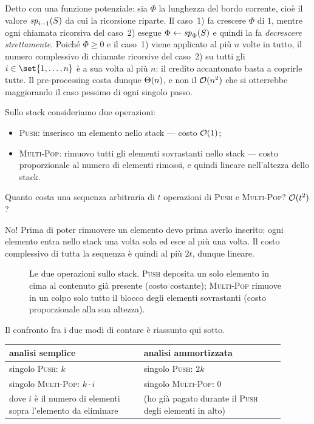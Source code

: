 \begin{osservazione}
  Detto con una funzione potenziale: sia $\Phi$ la lunghezza del bordo corrente,
  cioè il valore $\mathit{sp}_{i-1}(S)$ da cui la ricorsione riparte. Il caso~1) fa
  crescere $\Phi$ di $1$, mentre ogni chiamata ricorsiva del caso~2) esegue
  $\Phi \leftarrow \mathit{sp}_{\Phi}(S)$ e quindi la fa \emph{decrescere strettamente}.
  Poiché $\Phi\ge 0$ e il caso~1) viene applicato al più $n$ volte in tutto, il
  numero complessivo di chiamate ricorsive del caso~2) su tutti gli
  $i\in\set{1,\dots,n}$ è a sua volta al più $n$: il credito accantonato basta a
  coprirle tutte. Il pre-processing costa dunque $\Theta(n)$, e non il $\mathcal{O}(n^{2})$
  che si otterrebbe maggiorando il caso pessimo di ogni singolo passo.
\end{osservazione}

\begin{esempio}
  Sullo stack consideriamo due operazioni:
  \begin{itemize}
    \item \textsc{Push}: inserisco un elemento nello stack --- costo $\mathcal{O}(1)$;
    \item \textsc{Multi-Pop}: rimuovo tutti gli elementi sovrastanti nello
      stack --- costo proporzionale al numero di elementi rimossi, e quindi
      lineare nell'altezza dello stack.
  \end{itemize}
  Quanto costa una sequenza arbitraria di $t$ operazioni di \textsc{Push} e
  \textsc{Multi-Pop}? $\mathcal{O}(t^{2})$?

  No! Prima di poter rimuovere un elemento devo prima averlo inserito: ogni
  elemento entra nello stack una volta sola ed esce al più una volta. Il costo
  complessivo di tutta la sequenza è quindi al più $2t$, dunque lineare.
\end{esempio}

\begin{figure}[H]
  \centering
  
  \caption{Le due operazioni sullo stack. \textsc{Push} deposita un solo elemento
  in cima al contenuto già presente (costo costante); \textsc{Multi-Pop} rimuove
  in un colpo solo tutto il blocco degli elementi sovrastanti (costo
  proporzionale alla sua altezza).}
  \label{fig:stack-push-multipop}
\end{figure}

\noindent Il confronto fra i due modi di contare è riassunto qui sotto.

\begin{center}
\begin{tabular}{@{}p{0.44\linewidth}p{0.46\linewidth}@{}}
\toprule
\textbf{analisi semplice} & \textbf{analisi ammortizzata}\\
\midrule
singolo \textsc{Push}: $k$        & singolo \textsc{Push}: $2k$\\[4pt]
singolo \textsc{Multi-Pop}: $k\cdot i$ & singolo \textsc{Multi-Pop}: $0$\\[6pt]
\small dove $i$ è il numero di elementi sopra l'elemento da eliminare
& \small (ho già pagato durante il \textsc{Push} degli elementi in alto)\\
\bottomrule
\end{tabular}
\end{center}

